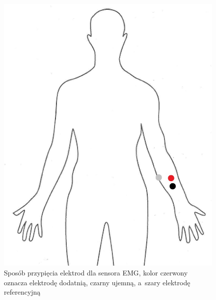 \begin{figure}
	\centering
	\includegraphics[height=0.3\textheight]{images/bitalino_placement.jpg}
	\caption{Sposób przypięcia elektrod dla sensora EMG,  kolor czerwony oznacza elektrodę dodatnią, czarny ujemną, a~szary elektrodę referencyjną}
	\label{fig:bitalino_placement}
\end{figure}

